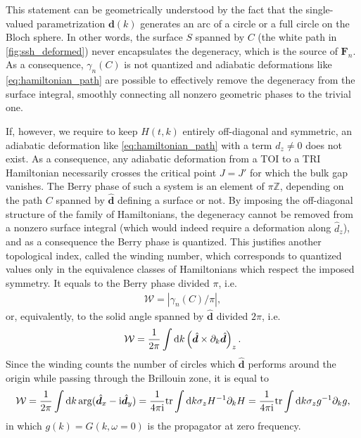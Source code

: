 This statement can be geometrically understood by the fact that the single-valued parametrization $\bm d(k)$ generates an arc of a circle or a full circle on the Bloch sphere.
In other words, the surface $S$ spanned by $C$ (the white path in \cref{fig:ssh_deformed}) never encapsulates the degeneracy, which is the source of ${\bm F}_n$.
As a consequence, $\gamma_n(C)$ is not quantized and adiabatic deformations like \cref{eq:hamiltonian_path} are possible to effectively remove the degeneracy from the surface integral, smoothly connecting all nonzero geometric phases to the trivial one.

If, however, we require to keep $H(t,k)$ entirely off-diagonal and symmetric, an adiabatic deformation like \cref{eq:hamiltonian_path} with a term $d_z\neq0$ does not exist.
As a consequence, any adiabatic deformation from a TOI to a TRI Hamiltonian necessarily crosses the critical point $J=J'$ for which the bulk gap vanishes.
The Berry phase of such a system is an element of $\pi\mathds Z$, depending on the path $C$ spanned by $\hat{\bm d}$ defining a surface or not.
By imposing the off-diagonal structure of the family of Hamiltonians, the degeneracy cannot be removed from a nonzero surface integral (which would indeed require a deformation along $\hat {d}_z$), and as a consequence the Berry phase is quantized.
This justifies another topological index, called the winding number, which corresponds to quantized values only in the equivalence classes of Hamiltonians which respect the imposed symmetry.
It equals to the Berry phase divided $\pi$, i.e.
\begin{align}
    \mathcal W = |\gamma_n(C)/\pi|,
\end{align}
or, equivalently, to the solid angle spanned by $\hat{\bm d}$ divided $2\pi$, i.e.
\begin{align}
    \mathcal W = \frac1{2\pi}\int\mathrm d k\left( \hat{\bm d}\times\partial_k\hat{\bm d} \right)_z.
\end{align}
Since the winding counts the number of circles which $\hat{\bm d}$ performs around the origin while passing through the Brillouin zone, it is equal to
\begin{align}
    \mathcal W = \frac{1}{2\pi}\int\mathrm d k \arg(\hat{\bm d}_x - \mathrm i \hat{\bm d}_y)
    =
    \frac{1}{4\pi\mathrm i} {\rm tr}\int\mathrm d k \sigma_z H^{-1}\partial_k H
    =
    \frac{1}{4\pi\mathrm i} {\rm tr}\int\mathrm d k \sigma_z g^{-1}\partial_k g,
    \label{eq:winding_number}
\end{align}
in which $g(k)=G(k,\omega=0)$ is the propagator at zero frequency.

